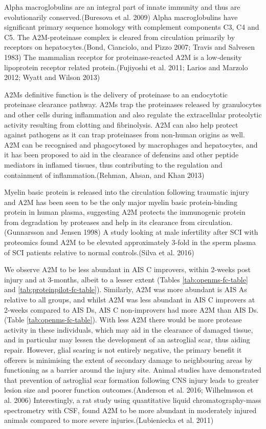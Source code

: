 \documentclass[9pt,lineno]{elife}
\begin{document}
Alpha macroglobulins are an integral part of innate immunity and thus are evolutionarily conserved.(Buresova et al. 2009)
Alpha macroglobulins have significant primary sequence homology with complement components C3, C4 and C5.
The A2M-proteinase complex is cleared from circulation primarily by receptors on hepatocytes.(Bond, Cianciolo, and Pizzo 2007; Travis and Salvesen 1983)
The mammalian receptor for proteinase‐reacted A2M is a low‐density lipoprotein receptor related protein.(Fujiyoshi et al. 2011; Larios and Marzolo 2012; Wyatt and Wilson 2013)

A2Ms definitive function is the delivery of proteinase to an endocytotic proteinase clearance pathway.
A2Ms trap the proteinases released by granulocytes and other cells during inflammation and also regulate the extracellular proteolytic activity resulting from clotting and fibrinolysis.
A2M can also help protect against pathogens as it can trap proteinases from non-human origins as well.
A2M can be recognised and phagocytosed by macrophages and hepatocytes, and it has been proposed to aid in the clearance of defensins and other peptide mediators in inflamed tissues, thus contributing to the regulation and containment of inflammation.(Rehman, Ahsan, and Khan 2013)

Myelin basic protein is released into the circulation following traumatic injury and A2M has been seen to be the only major myelin basic protein-binding protein in human plasma, suggesting A2M protects the immunogenic protein from degradation by proteases and help in its clearance from circulation.(Gunnarsson and Jensen 1998)
A study looking at male infertility after SCI with proteomics found A2M to be elevated approximately 3-fold in the sperm plasma of SCI patients relative to normal controls.(Silva et al. 2016)

We observe A2M to be less abundant in AIS C improvers, within 2-weeks post injury and at 3-months, albeit to a lesser extent (Tables \ref{tab:openms-fc-table} and \ref{tab:proteinpilot-fc-table}).
Similarly, A2M was more abundant is AIS As relative to all groups, and whilst A2M was less abundant in AIS C improvers at 2-weeks compared to AIS Ds, AIS C non-improvers had more A2M than AIS Ds. (Table \ref{tab:openms-fc-table}).
With less A2M there would be more protease activity in these individuals, which may aid in the clearance of damaged tissue, and in particular may lessen the development of an astroglial scar, thus aiding repair.
However, glial scaring is not entirely negative, the primary benefit it offerers is minimising the extent of secondary damage to neighbouring areas by functioning as a barrier around the injury site.
Animal studies have demonstrated that prevention of astroglial scar formation following CNS injury leads to greater lesion size and poorer function outcomes.(Anderson et al. 2016; Wilhelmsson et al. 2006)
Interestingly, a rat study using quantitative liquid chromatography-mass spectrometry with CSF, found A2M to be more abundant in moderately injured animals compared to more severe injuries.(Lubieniecka et al. 2011)
\end{document}
